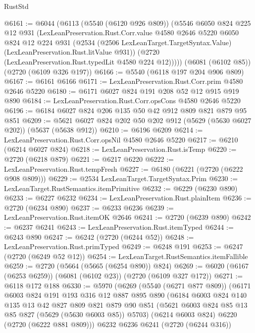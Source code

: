 \begin{lexlean}{RustStd}
\begin{coremodule}
@6161 := @6044
    (@6113
      (@5540 (@6120 @926 @809))
      (@5546
        @6050
        @824
        @225
        @12
        @931
        (LexLeanPreservation.Rust.Corr.value
          @4580
          @2646
          @5220
          @6050
          @824
          @12
          @224
          @931
          (@2534 (@2506 LexLeanTarget.TargetSyntax.Value) (LexLeanPreservation.Rust.litValue @931))
          (@2720 (LexLeanPreservation.Rust.typedLit @4580 @224 @12)))))
    (@6081 (@6102 @85))
    (@2720 (@6109 @326 @197))
@6166 := @5540 (@6118 @197 @204 @906 @809)
@6167 := @6161 @6166
@6171 := LexLeanPreservation.Rust.Corr.prim @4580 @2646 @5220
@6180 := @6171 @6027 @824 @191 @208 @52 @12 @915 @919 @890
@6184 := LexLeanPreservation.Rust.Corr.opsCons @4580 @2646 @5220
@6196 := @6184 @6027 @824 @206 @135 @50 @42 @912 @809 @821 @879 @95 @851
@6209 := @5621 @6027 @824 @202 @50 @202 @912 (@5629 (@5630 @6027 @202)) (@5637 (@5638 @912))
@6210 := @6196 @6209
@6214 := LexLeanPreservation.Rust.Corr.opsNil @4580 @2646 @5220
@6217 := @6210 (@6214 @6027 @824)
@6218 := LexLeanPreservation.Rust.isTemp
@6220 := @2720 (@6218 @879)
@6221 := @6217 @6220
@6222 := LexLeanPreservation.Rust.tempFresh
@6227 := @6180 (@6221 (@2720 (@6222 @908 @809)))
@6229 := @2534 LexLeanTarget.TargetSyntax.Prim
@6230 := LexLeanTarget.RustSemantics.itemPrimitive
@6232 := @6229 (@6230 @890)
@6233 := @6227 @6232
@6234 := LexLeanPreservation.Rust.plainItem
@6236 := @2720 (@6234 @890)
@6237 := @6233 @6236
@6239 := LexLeanPreservation.Rust.itemOK @2646
@6241 := @2720 (@6239 @890)
@6242 := @6237 @6241
@6243 := LexLeanPreservation.Rust.itemTyped
@6244 := @6243 @890
@6247 := @6242 (@2720 (@6244 @52))
@6248 := LexLeanPreservation.Rust.primTyped
@6249 := @6248 @191
@6253 := @6247 (@2720 (@6249 @52 @12))
@6254 := LexLeanTarget.RustSemantics.itemFallible
@6259 := @2720 (@5664 (@5665 (@6254 @890)) @824)
@6269 := @6020 (@6167 (@6253 @6259)) (@6081 (@6102 @23)) (@2720 (@6109 @327 @172))
@6271 := @6118 @172 @188
@6330 := @5970
    (@6269
      (@5540 (@6271 @877 @809))
      (@6171
        @6003
        @824
        @191
        @193
        @316
        @12
        @887
        @895
        @890
        (@6184
          @6003
          @824
          @140
          @135
          @13
          @42
          @827
          @809
          @821
          @879
          @90
          @851
          (@5621 @6003 @824 @85 @13 @85 @827 (@5629 (@5630 @6003 @85)) @5703)
          (@6214 @6003 @824)
          @6220
          (@2720 (@6222 @881 @809)))
        @6232
        @6236
        @6241
        (@2720 (@6244 @316))

\end{coremodule}
\end{lexlean}
